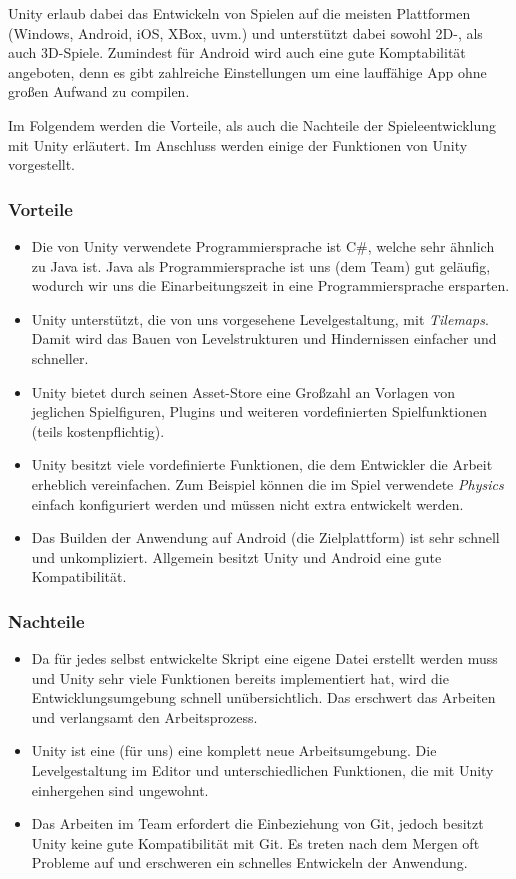 Unity erlaub dabei das Entwickeln von Spielen auf die meisten Plattformen (Windows, Android, iOS, XBox, uvm.) und unterstützt dabei sowohl 2D-, als auch 3D-Spiele. Zumindest für Android wird auch eine gute Komptabilität angeboten, denn es gibt zahlreiche Einstellungen um eine lauffähige App ohne großen Aufwand zu compilen. 

Im Folgendem werden die Vorteile, als auch die Nachteile der Spieleentwicklung mit Unity erläutert. Im Anschluss werden einige der Funktionen von Unity vorgestellt.
\subsubsection*{Vorteile}
\begin{itemize}
    \item Die von Unity verwendete Programmiersprache ist C\#, welche sehr ähnlich zu Java ist. Java als Programmiersprache ist uns (dem Team) gut geläufig, wodurch wir uns die Einarbeitungszeit in eine Programmiersprache ersparten.
    \item Unity unterstützt, die von uns vorgesehene Levelgestaltung, mit \textit{Tilemaps}. Damit wird das Bauen von Levelstrukturen und Hindernissen einfacher und schneller.
    \item Unity bietet durch seinen Asset-Store eine Großzahl an Vorlagen von jeglichen Spielfiguren, Plugins und weiteren vordefinierten Spielfunktionen (teils kostenpflichtig).
    \item Unity besitzt viele vordefinierte Funktionen, die dem Entwickler die Arbeit erheblich vereinfachen. Zum Beispiel können die im Spiel verwendete \textit{Physics} einfach konfiguriert werden und müssen nicht extra entwickelt werden.
    \item Das Builden der Anwendung auf Android (die Zielplattform) ist sehr schnell und unkompliziert. Allgemein besitzt Unity und Android eine gute Kompatibilität.
\end{itemize}

\subsubsection*{Nachteile}
\begin{itemize}
    \item Da für jedes selbst entwickelte Skript eine eigene Datei erstellt werden muss und Unity sehr viele Funktionen bereits implementiert hat, wird die Entwicklungsumgebung schnell unübersichtlich. Das erschwert das Arbeiten und verlangsamt den Arbeitsprozess.
    \item Unity ist eine (für uns) eine komplett neue Arbeitsumgebung. Die Levelgestaltung im Editor und unterschiedlichen Funktionen, die mit Unity einhergehen sind ungewohnt.
    \item Das Arbeiten im Team erfordert die Einbeziehung von Git, jedoch besitzt Unity keine gute Kompatibilität mit Git. Es treten nach dem Mergen oft Probleme auf und erschweren ein schnelles Entwickeln der Anwendung.
\end{itemize}

